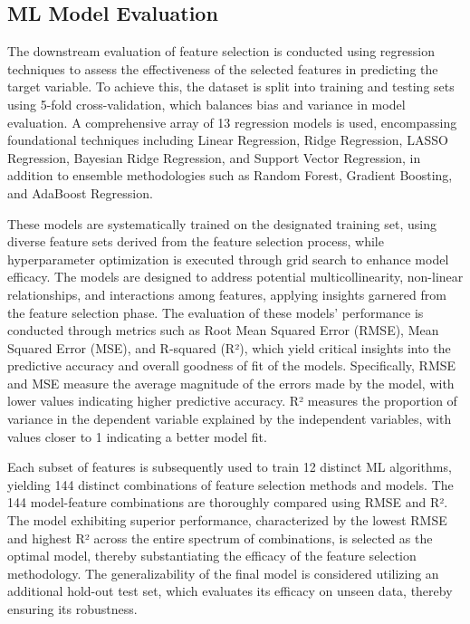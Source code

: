 \documentclass[12pt]{article}
\begin{document}
\subsection{ML Model Evaluation}

The downstream evaluation of feature selection is conducted using regression techniques to assess the effectiveness of the selected features in predicting the target variable. To achieve this, the dataset is split into training and testing sets using 5-fold cross-validation, which balances bias and variance in model evaluation. A comprehensive array of 13 regression models is used, encompassing foundational techniques including Linear Regression, Ridge Regression, LASSO Regression, Bayesian Ridge Regression, and Support Vector Regression, in addition to ensemble methodologies such as Random Forest, Gradient Boosting, and AdaBoost Regression. 

These models are systematically trained on the designated training set, using diverse feature sets derived from the feature selection process, while hyperparameter optimization is executed through grid search to enhance model efficacy. The models are designed to address potential multicollinearity, non-linear relationships, and interactions among features, applying insights garnered from the feature selection phase. The evaluation of these models' performance is conducted through metrics such as Root Mean Squared Error (RMSE), Mean Squared Error (MSE), and R-squared (R²), which yield critical insights into the predictive accuracy and overall goodness of fit of the models.
Specifically, RMSE and MSE measure the average magnitude of the errors made by the model, with lower values indicating higher predictive accuracy. R² measures the proportion of variance in the dependent variable explained by the independent variables, with values closer to 1 indicating a better model fit. 

Each subset of features is subsequently used to train 12 distinct ML algorithms, yielding 144 distinct combinations of feature selection methods and models. The 144 model-feature combinations are thoroughly compared using RMSE and R². The model exhibiting superior performance, characterized by the lowest RMSE and highest R² across the entire spectrum of combinations, is selected as the optimal model, thereby substantiating the efficacy of the feature selection methodology. The generalizability of the final model is considered utilizing an additional hold-out test set, which evaluates its efficacy on unseen data, thereby ensuring its robustness.
\end{document}
